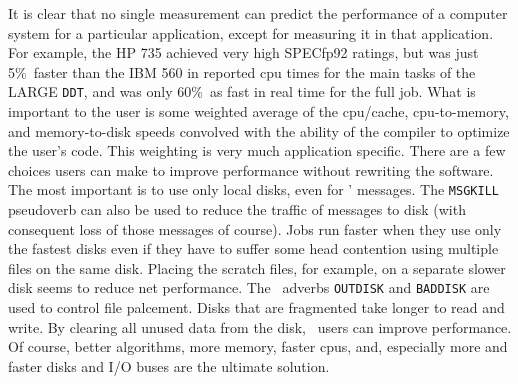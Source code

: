 It is clear that no single measurement can predict the performance of
a computer system for a particular application, except for measuring
it in that application.  For example, the HP 735 achieved very high
SPECfp92 ratings, but was just 5\%\ faster than the IBM 560 in
reported cpu times for the main tasks of the LARGE {\tt DDT}, and was
only 60\%\ as fast in real time for the full job.  What is
important to the user is some weighted average of the cpu/cache,
cpu-to-memory, and memory-to-disk speeds convolved with the ability of
the compiler to optimize the user's code.  This weighting is very much
application specific.  There are a few choices users can make to
improve performance without rewriting the software.  The most
important is to use only local disks, even for \AIPS' messages.  The
{\tt MSGKILL} pseudoverb can also be used to reduce the traffic of
messages to disk (with consequent loss of those messages of course).
Jobs run faster when they use only the fastest disks even if they have
to suffer some head contention using multiple files on the same disk.
Placing the scratch files, for example, on a separate slower disk
seems to reduce net performance.  The \AIPS\ adverbs {\tt OUTDISK} and
{\tt BADDISK} are used to control file palcement.  Disks that are
fragmented take longer to read and write.  By clearing all unused data
from the disk, \AIPS\ users can improve performance.  Of course,
better algorithms, more memory, faster cpus, and, especially more and
faster disks and I/O buses are the ultimate solution.

